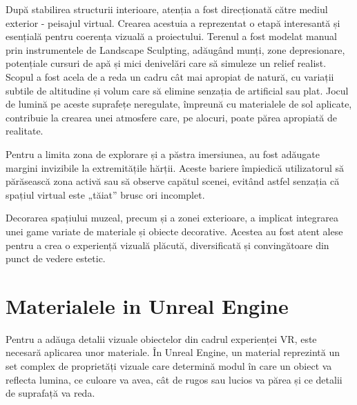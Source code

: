 După stabilirea structurii interioare, atenția a fost direcționată către mediul exterior - peisajul virtual. Crearea acestuia a reprezentat o etapă interesantă și esențială pentru coerența vizuală a proiectului. Terenul a fost modelat manual prin instrumentele de Landscape Sculpting, adăugând munți, zone depresionare, potențiale cursuri de apă și mici denivelări care să simuleze un relief realist. Scopul a fost acela de a reda un cadru cât mai apropiat de natură, cu variații subtile de altitudine și volum care să elimine senzația de artificial sau plat. Jocul de lumină pe aceste suprafețe neregulate, împreună cu materialele de sol aplicate, contribuie la crearea unei atmosfere care, pe alocuri, poate părea apropiată de realitate.

Pentru a limita zona de explorare și a păstra imersiunea, au fost adăugate margini invizibile la extremitățile hărții. Aceste bariere împiedică utilizatorul să părăsească zona activă sau să observe capătul scenei, evitând astfel senzația că spațiul virtual este „tăiat” brusc ori incomplet.

Decorarea spațiului muzeal, precum și a zonei exterioare, a implicat integrarea unei game variate de materiale și obiecte decorative. Acestea au fost atent alese pentru a crea o experiență vizuală plăcută, diversificată și convingătoare din punct de vedere estetic.

\section{Materialele in Unreal Engine}

Pentru a adăuga detalii vizuale obiectelor din cadrul experienței VR, este necesară aplicarea unor materiale. În Unreal Engine, un material reprezintă un set complex de proprietăți vizuale care determină modul în care un obiect va reflecta lumina, ce culoare va avea, cât de rugos sau lucios va părea și ce detalii de suprafață va reda.

